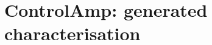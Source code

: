 \documentclass[11pt]{article}
\begin{document}
\section*{ControlAmp: generated characterisation}

\end{document}
